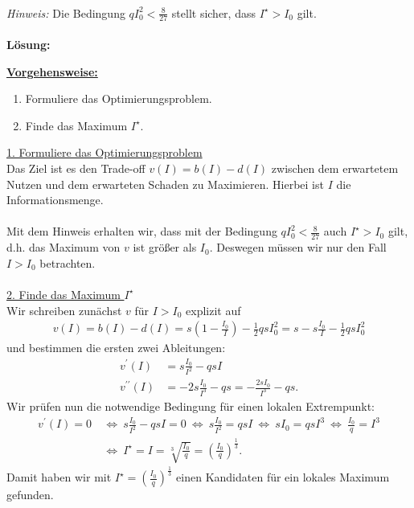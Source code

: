 \\
\textit{Hinweis:} Die Bedingung $q I_0^2 < \frac{8}{27}$ stellt sicher, dass $I^\star > I_0 $ gilt.\\
\\
\textbf{Lösung:}
\begin{mdframed}
\underline{\textbf{Vorgehensweise:}}
\begin{enumerate}
\item Formuliere das Optimierungsproblem.
\item Finde das Maximum $I^\star$.
\end{enumerate}
\end{mdframed}

\underline{1. Formuliere das Optimierungsproblem}\\
Das Ziel ist es den Trade-off $v(I) = b(I) - d(I)$ zwischen dem erwartetem Nutzen und dem erwarteten Schaden zu Maximieren. Hierbei ist $I$ die Informationsmenge.\\
\\
Mit dem Hinweis erhalten wir, dass mit der Bedingung $q I_0^2  < \frac{8}{27}$ auch $I^\star > I_0$ gilt, d.h. das Maximum von $v$ ist größer als $I_0$. Deswegen müssen wir nur den Fall $I > I_0$ betrachten.\\
\\
\underline{2. Finde das Maximum $I^\star$}\\
Wir schreiben zunächst $v$ für $I > I_0$ explizit auf
\begin{align*}
	v(I)
	=
	b(I) - d(I) 
	=
	s \left(1 - \frac{I_0}{I}\right)
	- \frac{1}{2} q s I_0^2
	=
	s - s \frac{I_0}{I} - \frac{1}{2} q s I_0^2
\end{align*}
und bestimmen die ersten zwei Ableitungen:
\begin{align*}
	v^\prime(I) &= s \frac{I_0}{I^2} - q s I\\
	v^{\prime \prime}(I) &= -2s \frac{I_0}{I^3} - qs
	= - \frac{2s I_0}{I^3} - qs. 
\end{align*}
Wir prüfen nun die notwendige Bedingung für einen lokalen Extrempunkt:
\begin{align*}
	v^\prime(I) = 0 
	&\ \Leftrightarrow \
	s \frac{I_0}{I^2} - q s I = 0
	\ \Leftrightarrow \
	s \frac{I_0}{I^2} = qs I 
	\ \Leftrightarrow \
	s I_0 = qs I^3
	\ \Leftrightarrow \ 
	 \frac{I_0}{q} =  I^3 \\
	 &\ \Leftrightarrow \
	   I^\star = I  = \sqrt[3]{\frac{I_0}{q}} = \left( \frac{I_0}{q}\right)^{\frac{1}{3}}.
\end{align*}
Damit haben wir mit $I^\star = \left( \frac{I_0}{q}\right)^{\frac{1}{3}}$ einen Kandidaten für ein lokales Maximum gefunden.\\
